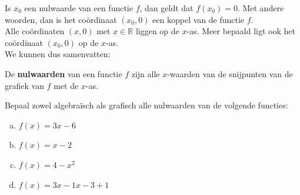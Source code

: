 \documentclass[12pt,twoside]{article}
\begin{document}
\begin{minipage}{0.5\textwidth}
Is $x_0$ een nulwaarde van een functie $f$, dan geldt dat $f(x_0)=0$. Met andere woorden, dan is het coördinaat $(x_0,0)$ een koppel van de functie $f$.\\

Alle coördinaten $(x,0)$ met $x\in\mathbb{R}$ liggen op de $x$-as. Meer bepaald ligt ook het coördinaat $(x_0,0)$ op de $x$-as.\\

We kunnen dus samenvatten:
\end{minipage}
\begin{minipage}{0.5\textwidth}
  \begin{center}
  \end{center}
\end{minipage}

De {\bf nulwaarden} van een functie $f$ zijn alle $x$-waarden van de snijpunten van de grafiek van $f$ met de $x$-as.

\begin{oefening}
Bepaal zowel algebraïsch als grafisch alle nulwaarden van de volgende functies:
\begin{enumerate}[(a)]
  \item $f(x)=3x-6$
  \item $f(x)=x-2$
  \item $f(x)=4-x^2$
  \item $f(x)=3x-1x-3+1$
\end{enumerate}
\end{oefening}
\end{document}
